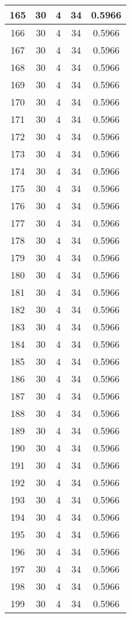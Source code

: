 \documentclass[letterpaper, 12pt]{article}
\begin{document}
\begin{longtable}{|c|c|c|c|c|}
\hline
165 & 30 & 4 & 34 & 0.5966 \\
\hline
166 & 30 & 4 & 34 & 0.5966 \\
\hline
167 & 30 & 4 & 34 & 0.5966 \\
\hline
168 & 30 & 4 & 34 & 0.5966 \\
\hline
169 & 30 & 4 & 34 & 0.5966 \\
\hline
170 & 30 & 4 & 34 & 0.5966 \\
\hline
171 & 30 & 4 & 34 & 0.5966 \\
\hline
172 & 30 & 4 & 34 & 0.5966 \\
\hline
173 & 30 & 4 & 34 & 0.5966 \\
\hline
174 & 30 & 4 & 34 & 0.5966 \\
\hline
175 & 30 & 4 & 34 & 0.5966 \\
\hline
176 & 30 & 4 & 34 & 0.5966 \\
\hline
177 & 30 & 4 & 34 & 0.5966 \\
\hline
178 & 30 & 4 & 34 & 0.5966 \\
\hline
179 & 30 & 4 & 34 & 0.5966 \\
\hline
180 & 30 & 4 & 34 & 0.5966 \\
\hline
181 & 30 & 4 & 34 & 0.5966 \\
\hline
182 & 30 & 4 & 34 & 0.5966 \\
\hline
183 & 30 & 4 & 34 & 0.5966 \\
\hline
184 & 30 & 4 & 34 & 0.5966 \\
\hline
185 & 30 & 4 & 34 & 0.5966 \\
\hline
186 & 30 & 4 & 34 & 0.5966 \\
\hline
187 & 30 & 4 & 34 & 0.5966 \\
\hline
188 & 30 & 4 & 34 & 0.5966 \\
\hline
189 & 30 & 4 & 34 & 0.5966 \\
\hline
190 & 30 & 4 & 34 & 0.5966 \\
\hline
191 & 30 & 4 & 34 & 0.5966 \\
\hline
192 & 30 & 4 & 34 & 0.5966 \\
\hline
193 & 30 & 4 & 34 & 0.5966 \\
\hline
194 & 30 & 4 & 34 & 0.5966 \\
\hline
195 & 30 & 4 & 34 & 0.5966 \\
\hline
196 & 30 & 4 & 34 & 0.5966 \\
\hline
197 & 30 & 4 & 34 & 0.5966 \\
\hline
198 & 30 & 4 & 34 & 0.5966 \\
\hline
199 & 30 & 4 & 34 & 0.5966 \\
\hline
\end{longtable}
\end{document}
